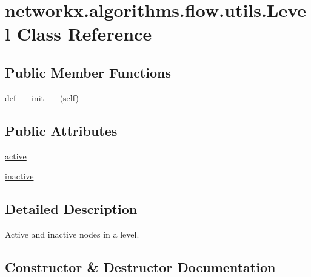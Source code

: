 \hypertarget{classnetworkx_1_1algorithms_1_1flow_1_1utils_1_1Level}{}\section{networkx.\+algorithms.\+flow.\+utils.\+Level Class Reference}
\label{classnetworkx_1_1algorithms_1_1flow_1_1utils_1_1Level}
\subsection*{Public Member Functions}
\begin{DoxyCompactItemize}
\item 
def \hyperlink{classnetworkx_1_1algorithms_1_1flow_1_1utils_1_1Level_aaebebd6fe6714eddaedc18e14410f9cb}{\+\_\+\+\_\+init\+\_\+\+\_\+} (self)
\end{DoxyCompactItemize}
\subsection*{Public Attributes}
\begin{DoxyCompactItemize}
\item 
\hyperlink{classnetworkx_1_1algorithms_1_1flow_1_1utils_1_1Level_a8275a6fc49b602ea7dc4d01f2cf2d528}{active}
\item 
\hyperlink{classnetworkx_1_1algorithms_1_1flow_1_1utils_1_1Level_a69956183c04fdc30312c85f86a793ec2}{inactive}
\end{DoxyCompactItemize}


\subsection{Detailed Description}
\begin{DoxyVerb}Active and inactive nodes in a level.\end{DoxyVerb}
 

\subsection{Constructor \& Destructor Documentation}
\mbox{\label{classnetworkx_1_1algorithms_1_1flow_1_1utils_1_1Level_aaebebd6fe6714eddaedc18e14410f9cb}} 
